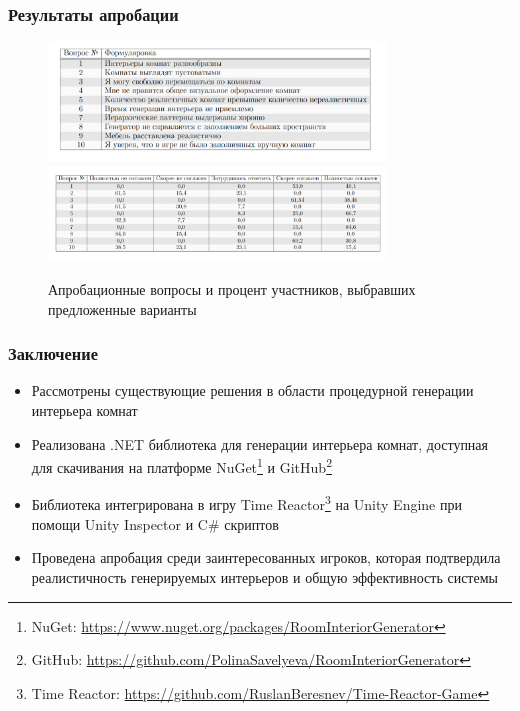 \documentclass{beamer}
\begin{document}
\begin{frame}[t]
    \frametitle{Результаты апробации}
    \begin{figure}
      \centering
        \includegraphics[width=0.8\textwidth]{pictures/questions.png}
        \includegraphics[width=0.8\textwidth]{pictures/experiment.png}
        \caption{Апробационные вопросы и процент участников, выбравших предложенные варианты}
    \end{figure}
\end{frame}


\begin{frame}
  \frametitle{Заключение}
    \begin{itemize}
        \item Рассмотрены существующие решения в области процедурной генерации интерьера комнат
        \item Реализована .NET библиотека для генерации интерьера комнат, доступная для скачивания на платформе NuGet\footnote{NuGet: \url{https://www.nuget.org/packages/RoomInteriorGenerator}} и GitHub\footnote{GitHub: \url{https://github.com/PolinaSavelyeva/RoomInteriorGenerator}}
        \item Библиотека интегрирована в игру Ti\-me Re\-ac\-tor\footnote{Time Reactor: \url{https://github.com/RuslanBeresnev/Time-Reactor-Game}} на Uni\-ty En\-gi\-ne при помощи Uni\-ty Ins\-pec\-tor и C\# скриптов
        \item Проведена апробация среди заинтересованных игроков, которая подтвердила реалистичность генерируемых интерьеров и общую эффективность системы 
    \end{itemize}
\end{frame}
\end{document}
